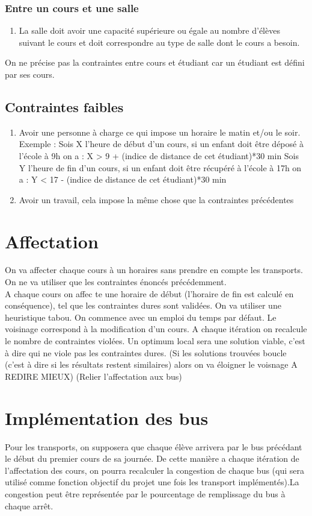 \documentclass[a4paper,11pt]{article}
\begin{document}
			\subsubsection{Entre un cours et une salle}
				\begin{enumerate}
					\item 	La salle doit avoir une capacité supérieure ou égale au nombre d'élèves suivant le cours et doit correspondre au type de salle dont le cours a besoin.
				\end{enumerate}
	On ne précise pas la contraintes entre cours et étudiant car un étudiant est défini par ses cours.
	\subsection{Contraintes faibles}
		\begin{enumerate}
			\item Avoir une personne à charge ce qui impose un horaire le matin et/ou le soir.
			Exemple : Sois X l'heure de début d'un cours, si un enfant doit être déposé à l'école à 9h on a : X > 9 + (indice de distance de cet étudiant)*30 min
			Sois Y l'heure de fin d'un cours, si un enfant doit être récupéré à l'école à 17h on a : Y < 17 - (indice de distance de cet étudiant)*30 min
			\item Avoir un travail, cela impose la même chose que la contraintes précédentes
		\end{enumerate}
\section{Affectation}
	On va affecter chaque cours à un horaires sans prendre en compte les transports. On ne va utiliser que les contraintes énoncés précédemment. \\
	A chaque cours on affec		te une horaire de début (l'horaire de fin est calculé en conséquence), tel que les contraintes dures sont validées.
	On va utiliser une heuristique tabou. On commence avec un emploi du temps par défaut. Le voisinage correspond à la modification d'un cours. A chaque itération on recalcule le nombre de contraintes violées. Un optimum local sera une solution viable, c'est à dire qui ne viole pas les contraintes dures.
	(Si les solutions trouvées boucle (c'est à dire si les résultats restent similaires) alors on va éloigner le voisnage A REDIRE MIEUX)
	(Relier l'affectation aux bus)	
\section{Implémentation des bus}
	Pour les transports, on supposera que chaque élève arrivera par le bus précédant le début du premier cours de sa journée. De cette manière a chaque itération de l'affectation des cours, on pourra recalculer la congestion de chaque bus (qui sera utilisé comme fonction objectif du projet une fois les transport implémentés).La congestion peut être représentée par le pourcentage de remplissage du bus à chaque arrêt. 
	
\end{document}
